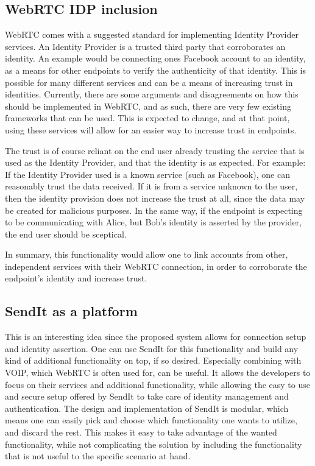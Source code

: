   \subsection{WebRTC IDP inclusion}
    WebRTC comes with a suggested standard for implementing Identity Provider services. An Identity Provider is a trusted third party that corroborates an identity. An example would be connecting ones Facebook account to an identity, as a means for other endpoints to verify the authenticity of that identity. This is possible for many different services and can be a means of increasing trust in identities. Currently, there are some arguments and disagreements on how this should be implemented in WebRTC, and as such, there are very few existing frameworks that can be used. This is expected to change, and at that point, using these services will allow for an easier way to increase trust in endpoints.

    The trust is of course reliant on the end user already trusting the service that is used as the Identity Provider, and that the identity is as expected. For example:\\
    If the Identity Provider used is a known service (such as Facebook), one can reasonably trust the data received. If it is from a service unknown to the user, then the identity provision does not increase the trust at all, since the data may be created for malicious purposes. In the same way, if the endpoint is expecting to be communicating with Alice, but Bob's identity is asserted by the provider, the end user should be sceptical.

    In summary, this functionality would allow one to link accounts from other, independent services with their WebRTC connection, in order to corroborate the endpoint's identity and increase trust.

  \subsection{SendIt as a platform}
    This is an interesting idea since the proposed system allows for connection setup and identity assertion. One can use SendIt for this functionality and build any kind of additional functionality on top, if so desired. Especially combining with VOIP, which WebRTC is often used for, can be useful. It allows the developers to focus on their services and additional functionality, while allowing the easy to use and secure setup offered by SendIt to take care of identity management and authentication. The design and implementation of SendIt is modular, which means one can easily pick and choose which functionality one wants to utilize, and discard the rest. This makes it easy to take advantage of the wanted functionality, while not complicating the solution by including the functionality that is not useful to the specific scenario at hand. 